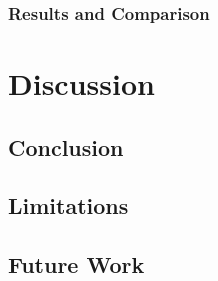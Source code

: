 \documentclass[11pt]{article}
\begin{document}
\subsubsection{Results and Comparison}
\label{sec-7-3-2}
\section{Discussion}
\label{sec-8}
\subsection{Conclusion}
\label{sec-8-1}
\subsection{Limitations}
\label{sec-8-2}
\subsection{Future Work}
\label{sec-8-3}
\end{document}
